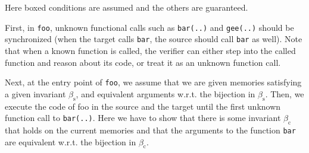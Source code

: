 Here boxed conditions are assumed and the others are guaranteed.

First, in \texttt{foo}, unknown functional calls such as
\texttt{bar(..)} and \texttt{gee(..)} should be synchronized (\ie when
the target calls \texttt{bar}, the source should call \texttt{bar} as
well). Note that when a known function is called, the verifier can either step into
the called function and reason about its code, or treat
it as an unknown function call.

Next, at the entry point of \texttt{foo}, we assume that we are given
memories satisfying a given invariant $\beta_\textrm{s}$, and
equivalent arguments w.r.t. the bijection in $\beta_\textrm{s}$.
Then, we execute the code of \textrm{foo} in the source and the target
until the first unknown function call to \texttt{bar(..)}.  Here we have
to show that there is some invariant $\beta_\textrm{c}$ that holds on
the current memories and that the arguments to the function \texttt{bar}
are equivalent w.r.t. the bijection in $\beta_\textrm{c}$.


